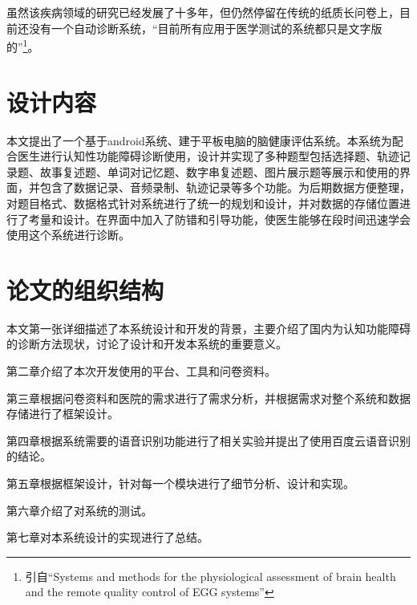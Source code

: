 虽然该疾病领域的研究已经发展了十多年，但仍然停留在传统的纸质长问卷上，目前还没有一个自动诊断系统，“目前所有应用于医学测试的系统都只是文字版的”\footnote{引自“Systems and methods for the physiological assessment of brain health and the remote quality control of EGG systems”}。

\section{设计内容}

本文提出了一个基于android系统、建于平板电脑的脑健康评估系统。本系统为配合医生进行认知性功能障碍诊断使用，设计并实现了多种题型包括选择题、轨迹记录题、故事复述题、单词对记忆题、数字串复述题、图片展示题等展示和使用的界面，并包含了数据记录、音频录制、轨迹记录等多个功能。为后期数据方便整理，对题目格式、数据格式针对系统进行了统一的规划和设计，并对数据的存储位置进行了考量和设计。在界面中加入了防错和引导功能，使医生能够在段时间迅速学会使用这个系统进行诊断。

\section{论文的组织结构}

本文第一张详细描述了本系统设计和开发的背景，主要介绍了国内为认知功能障碍的诊断方法现状，讨论了设计和开发本系统的重要意义。

第二章介绍了本次开发使用的平台、工具和问卷资料。

第三章根据问卷资料和医院的需求进行了需求分析，并根据需求对整个系统和数据存储进行了框架设计。

第四章根据系统需要的语音识别功能进行了相关实验并提出了使用百度云语音识别的结论。

第五章根据框架设计，针对每一个模块进行了细节分析、设计和实现。

第六章介绍了对系统的测试。

第七章对本系统设计的实现进行了总结。

